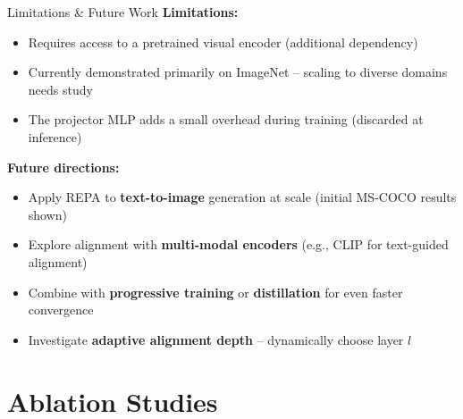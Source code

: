 \documentclass[aspectratio=169, 10pt]{beamer}
\begin{document}
\begin{frame}{Limitations \& Future Work}
\textbf{Limitations:}
\begin{itemize}
  \item Requires access to a pretrained visual encoder (additional dependency)
  \item Currently demonstrated primarily on ImageNet -- scaling to diverse domains needs study
  \item The projector MLP adds a small overhead during training (discarded at inference)
\end{itemize}

\vspace{1em}
\textbf{Future directions:}
\begin{itemize}
  \item Apply REPA to \textbf{text-to-image} generation at scale (initial MS-COCO results shown)
  \item Explore alignment with \textbf{multi-modal encoders} (e.g., CLIP for text-guided alignment)
  \item Combine with \textbf{progressive training} or \textbf{distillation} for even faster convergence
  \item Investigate \textbf{adaptive alignment depth} -- dynamically choose layer $l$
\end{itemize}
\end{frame}

\section{Ablation Studies}
\end{document}
